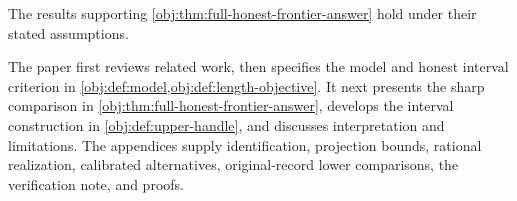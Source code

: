 The results supporting \cref{obj:thm:full-honest-frontier-answer} hold under their stated assumptions.

The paper first reviews related work, then specifies the model and honest interval criterion in \cref{obj:def:model,obj:def:length-objective}. It next presents the sharp comparison in \cref{obj:thm:full-honest-frontier-answer}, develops the interval construction in \cref{obj:def:upper-handle}, and discusses interpretation and limitations. The appendices supply identification, projection bounds, rational realization, calibrated alternatives, original-record lower comparisons, the verification note, and proofs.

